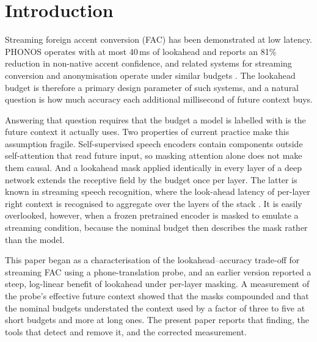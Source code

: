 \documentclass[preprint,12pt,authoryear]{elsarticle}
\begin{document}
\section{Introduction}

Streaming foreign accent conversion (FAC) has been demonstrated at low
latency. PHONOS \citep{phonos2026} operates with at most 40\,ms of lookahead
and reports an 81\% reduction in non-native accent confidence, and related
systems for streaming conversion and anonymisation operate under similar
budgets \citep{tvtsyn2026, darkstream2025}. The lookahead budget is therefore a
primary design parameter of such systems, and a natural question is how much
accuracy each additional millisecond of future context buys.

Answering that question requires that the budget a model is labelled with is
the future context it actually uses. Two properties of current practice make
this assumption fragile. Self-supervised speech encoders contain components
outside self-attention that read future input, so masking attention alone does
not make them causal. And a lookahead mask applied identically in every layer
of a deep network extends the receptive field by the budget once per layer.
The latter is known in streaming speech recognition, where the look-ahead
latency of per-layer right context is recognised to aggregate over the layers
of the stack \citep{zhang2020transformertransducer}. It is easily overlooked,
however, when a frozen pretrained encoder is masked to emulate a streaming
condition, because the nominal budget then describes the mask rather than the
model.

This paper began as a characterisation of the lookahead--accuracy trade-off
for streaming FAC using a phone-translation probe, and an earlier version
reported a steep, log-linear benefit of lookahead under per-layer masking. A
measurement of the probe's effective future context showed that the masks
compounded and that the nominal budgets understated the context used by a
factor of three to five at short budgets and more at long ones. The present paper reports that finding, the tools
that detect and remove it, and the corrected measurement.
\end{document}
